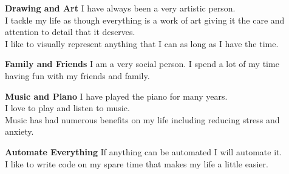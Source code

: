 
\begin{cvparagraph}

\begin{description}
  \item[] \textbf{Drawing and Art} \newline
  I have always been a very artistic person. \\
  I tackle my life as though everything is a work of art giving it the care and attention to detail that it deserves. \\
  I like to visually represent anything that I can as long as I have the time.
  \item[] \textbf{Family and Friends} \newline
  I am a very social person.  I spend a lot of my time having fun with my friends and family.
  \item[] \textbf{Music and Piano} \newline
  I have played the piano for many years. \\
  I love to play and listen to music. \\
  Music has had numerous benefits on my life including reducing stress and anxiety.
  \item[] \textbf{Automate Everything} \newline
  If anything can be automated I will automate it. \\
  I like to write code on my spare time that makes my life a little easier.
\end{description}


\end{cvparagraph}
